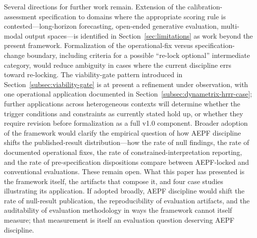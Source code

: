 \documentclass[11pt]{article}
\begin{document}
Several directions for further work remain. Extension of the
calibration-assessment specification to domains where the
appropriate scoring rule is contested---long-horizon forecasting,
open-ended generative evaluation, multi-modal output spaces---is
identified in Section~\ref{sec:limitations} as work beyond the
present framework. Formalization of the operational-fix versus
specification-change boundary, including criteria for a possible
``re-lock optional'' intermediate category, would reduce ambiguity
in cases where the current discipline errs toward re-locking.
The viability-gate pattern introduced in
Section~\ref{subsec:viability-gate} is at present a refinement
under observation, with one operational application documented in
Section~\ref{subsec:dynametrix-hrrr-case}; further applications
across heterogeneous contexts will determine whether the trigger
conditions and constraints as currently stated hold up, or whether
they require revision before formalization as a full v1.0
component. Broader adoption of the framework would clarify the
empirical question of how AEPF discipline shifts the
published-result distribution---how the rate of null findings, the
rate of documented operational fixes, the rate of
constrained-interpretation reporting, and the rate of
pre-specification dispositions compare between AEPF-locked and
conventional evaluations. These remain open. What this paper has
presented is the framework itself, the artifacts that compose it,
and four case studies illustrating its application. If adopted
broadly, AEPF discipline would shift the rate of null-result
publication, the reproducibility of evaluation artifacts, and the
auditability of evaluation methodology in ways the framework
cannot itself measure; that measurement is itself an evaluation
question deserving AEPF discipline.




\end{document}
